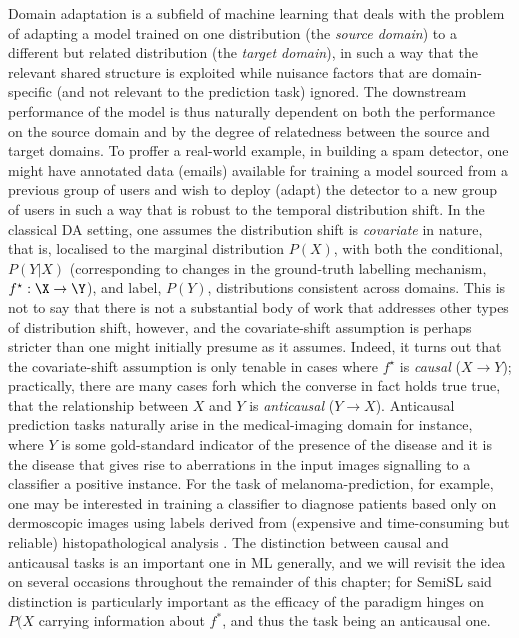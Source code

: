 Domain adaptation is a subfield of machine learning that deals with the problem of adapting a model
trained on one distribution (the \emph{source domain}) to a different but related distribution (the
\emph{target domain}), in such a way that the relevant shared structure is exploited while nuisance
factors that are domain-specific (and not relevant to the prediction task) ignored.
%
The downstream performance of the  model is thus naturally dependent on both the performance on the
source domain and by the degree of relatedness between the source and target domains.
%
To proffer a real-world example, in building a spam detector, one might have annotated data
(emails) available for training a model sourced from a previous group of users and wish to deploy
(adapt) the detector to a new group of users in such a way that is robust to the temporal
distribution shift.
%
In the classical DA setting, one assumes the distribution shift is \emph{covariate}
\cite{david2010impossibility} in nature, that is, localised to the marginal distribution
\(P(X)\), with both the conditional, \(P(Y|X)\) (corresponding to changes in the ground-truth
labelling mechanism, \(f^\star: \X \to \Y \)), and label, \(P(Y)\), distributions consistent across
domains.
%
This is not to say that there is not a substantial body of work that addresses other types
of distribution shift, however\citep{zhao2019learning}, and the covariate-shift assumption is
perhaps stricter than one might initially presume as it assumes.
%
Indeed, it turns out that the covariate-shift assumption is only tenable in cases where \(f^\star\)
is \emph{causal} (\(X \to Y\)); practically, there are many cases forh which the converse in fact
holds true true, that the relationship between \(X\) and \(Y\) is \emph{anticausal} (\(Y \to X\)).
%
Anticausal prediction tasks naturally arise in the medical-imaging domain for instance, where \(Y\)
is some gold-standard indicator of the presence of the disease and it is the disease that gives
rise to aberrations in the input images signalling to a classifier a positive instance. 
%
For the task of melanoma-prediction, for example, one may be interested in training a classifier to
diagnose patients based only on dermoscopic images using labels derived from (expensive and
time-consuming but reliable) histopathological analysis \citep{castro2020causality}.
%
The distinction between causal and anticausal tasks is an important one in ML generally, and we
will revisit the idea on several occasions throughout the remainder of this chapter; for SemiSL
said distinction is particularly important as the efficacy of the paradigm hinges on \(P(X\)
carrying information about \(f^\ast\), and thus the task being an anticausal one.
%

